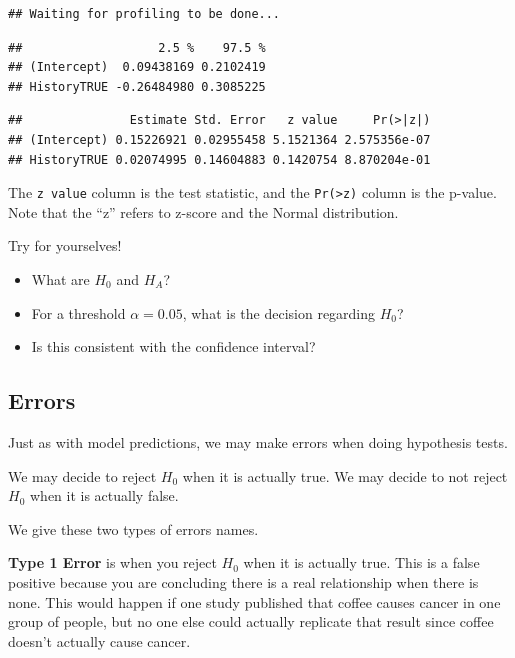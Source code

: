 \documentclass[
]{book}
\newenvironment{Shaded}{\begin{snugshade}}{\end{snugshade}}
\newcommand{\KeywordTok}[1]{\textcolor[rgb]{0.13,0.29,0.53}{\textbf{#1}}}
\newcommand{\NormalTok}[1]{#1}
\newcommand{\OperatorTok}[1]{\textcolor[rgb]{0.81,0.36,0.00}{\textbf{#1}}}
\providecommand{\tightlist}{%
  \setlength{\itemsep}{0pt}\setlength{\parskip}{0pt}}
\begin{document}
\begin{verbatim}
## Waiting for profiling to be done...
\end{verbatim}

\begin{verbatim}
##                   2.5 %    97.5 %
## (Intercept)  0.09438169 0.2102419
## HistoryTRUE -0.26484980 0.3085225
\end{verbatim}

\begin{Shaded}
\end{Shaded}

\begin{verbatim}
##               Estimate Std. Error   z value     Pr(>|z|)
## (Intercept) 0.15226921 0.02955458 5.1521364 2.575356e-07
## HistoryTRUE 0.02074995 0.14604883 0.1420754 8.870204e-01
\end{verbatim}

The \texttt{z\ value} column is the test statistic, and the \texttt{Pr(\textgreater{}\textbar{}z\textbar{})} column is the p-value. Note that the ``z'' refers to z-score and the Normal distribution.

Try for yourselves!

\begin{itemize}
\tightlist
\item
  What are \(H_0\) and \(H_A\)?
\item
  For a threshold \(\alpha = 0.05\), what is the decision regarding \(H_0\)?
\item
  Is this consistent with the confidence interval?
\end{itemize}

\hypertarget{errors}{%
\subsection{Errors}\label{errors}}

Just as with model predictions, we may make errors when doing hypothesis tests.

We may decide to reject \(H_0\) when it is actually true. We may decide to not reject \(H_0\) when it is actually false.

We give these two types of errors names.

\textbf{Type 1 Error} is when you reject \(H_0\) when it is actually true. This is a false positive because you are concluding there is a real relationship when there is none. This would happen if one study published that coffee causes cancer in one group of people, but no one else could actually replicate that result since coffee doesn't actually cause cancer.
\end{document}
